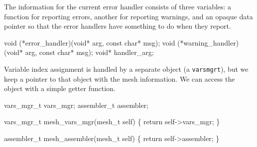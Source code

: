The information for the current error handler consists of three
variables: a function for reporting errors, another for reporting 
warnings, and an opaque data pointer so that the error handlers
have something to do when they report.

\nwenddocs{}\plusendmoddef
void (*error_handler)(void* arg, const char* msg);
void (*warning_handler)(void* arg, const char* msg);
void* handler_arg;
\nwendcode{}\nwdocspar

Variable index assignment is handled by a separate object (a
{\tt{}vars{}mgr{}t}), but we keep a pointer to that object with the
mesh information.  We can access the object with a simple
getter function.

\nwenddocs{}\plusendmoddef
vars_mgr_t vars_mgr;
assembler_t assembler;
\nwendcode{}\nwdocspar

\nwenddocs{}\endmoddef
vars_mgr_t mesh_vars_mgr(mesh_t self)
\{
    return self->vars_mgr;
\}

assembler_t mesh_assembler(mesh_t self)
\{
    return self->assembler;
\}

\nwendcode{}\nwdocspar


